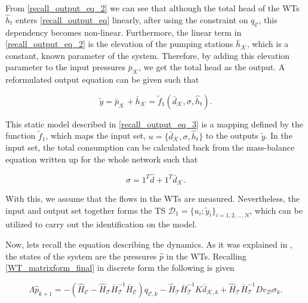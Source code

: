 From \eqref{recall_output_eq_2} we can see that although the total head of the WTs $\hat{h}_t$ enters \eqref{recall_output_eq} linearly, after using the constraint on $q_\mathcal{C}$, this dependency becomes non-linear. Furthermore, the linear term in \eqref{recall_output_eq_2} is the elevation of the pumping stations $\bar{h}_{\mathcal{K}}$, which is a constant, known parameter of the system. Therefore, by adding this elevation parameter to the input pressures $\bar{p}_{\mathcal{K}}$, we get the total head as the output. A reformulated output equation can be given such that 

 \begin{equation}
  \label{recall_output_eq_3}
  \tilde{y} = \bar{p}_{\mathcal{K}} + \bar{h}_{\mathcal{K}} = \tilde{f}_1(\bar{d}_{\mathcal{K}}, \sigma, \hat{h}_t ). 
\end{equation} 

This static model described in \eqref{recall_output_eq_3} is a mapping defined by the function $\tilde{f}_1$, which maps the input set, $u = \{ \bar{d}_{\mathcal{K}}, \sigma, \hat{h}_t \}$ to the outputs $\tilde{y}$. In the input set, the total consumption can be calculated back from the mass-balance equation written up for the whole network such that

\begin{equation}
\label{massbalance_identification}
 \sigma = 1^T \hat{d} + 1^T \bar{d}_{\mathcal{K}}.
\end{equation}

With this, we assume that the flows in the WTs are measured. Nevertheless, the input and output set together forms the TS $\mathcal{D}_1 = \{u_i ; \tilde{y}_i\}_{i = 1,2, ..., N}$, which can be utilized to carry out the identification on the model. 

Now, lets recall the equation describing the dynamics. As it was explained in , the states of the system are the pressures $\hat{p}$ in the WTs. Recalling \eqref{WT_matrixform_final} in discrete form the following is given

\begin{equation}
\label{WT_matrixform_final_discrete}
\Lambda \hat{p}_{k+1} = - (\hat{H}_{\mathcal{C}} - \hat{H}_{\mathcal{T}} \bar{H}^{-1}_{\mathcal{T}}\bar{H}_{\mathcal{C}})  q_{\mathcal{C},k}  - \hat{H}_{\mathcal{T}} \bar{H}^{-1}_{\mathcal{T}} K \bar{d}_{\mathcal{K},k} + \hat{H}_{\mathcal{T}} \bar{H}^{-1}_{\mathcal{T}} D v_{\mathcal{D}} \sigma_k.
\end{equation}

